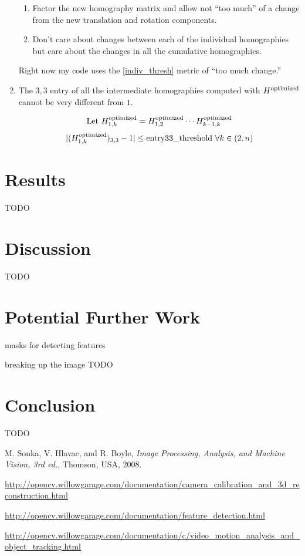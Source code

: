 \documentclass{article}
\begin{document}
\begin{enumerate}
\begin{enumerate}
\item Factor the new homography matrix and allow not ``too much'' of a change
from the new translation and rotation components.   

\item Don't care about changes between each of the individual homographies but
care about the changes in all the cumulative homographies. 

\end{enumerate} 

Right now my code uses the \ref{indiv_thresh} metric of ``too much change.''

\item The $3, 3$ entry of all the intermediate homographies computed with
$H^{\textnormal{optimized}}$ cannot be very different from $1$.

\[\textnormal{Let } H_{1, k}^{\textnormal{optimized}} = H_{1, 2}^{\textnormal{optimized}} \cdots H_{k - 1, k}^{\textnormal{optimized}}\]
\[|(H_{1, k}^{\textnormal{optimized}})_{3, 3} - 1| \leq \textnormal{entry33\_threshold } \forall k \in (2, n)\]

\end{enumerate}

\section{Results}

TODO

\section{Discussion}

TODO

\section{Potential Further Work}

masks for detecting features

breaking up the image
TODO

\section{Conclusion}

TODO

\begin{thebibliography}{1}

 M. Sonka, V. Hlavac, and R. Boyle, \emph{Image Processing, Analysis, and Machine Vision, 3rd ed.}, Thomson, USA, 2008.

 \url{http://opencv.willowgarage.com/documentation/camera_calibration_and_3d_reconstruction.html}

 \url{http://opencv.willowgarage.com/documentation/feature_detection.html}

 \url{http://opencv.willowgarage.com/documentation/c/video_motion_analysis_and_object_tracking.html}

\end{thebibliography}
\end{document}
